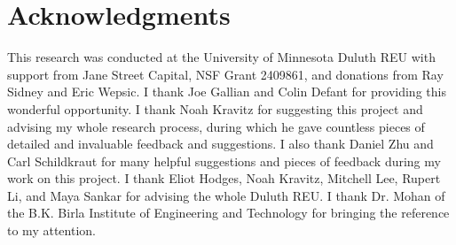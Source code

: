 \documentclass[10pt,a4paper]{article}
\theoremstyle{definition}
\theoremstyle{remark}
\numberwithin{equation}{section}
\numberwithin{theorem}{section}
\begin{document}
\section*{Acknowledgments}
This research was conducted at the University of Minnesota Duluth REU with support from Jane Street Capital, NSF Grant 2409861, and donations from Ray Sidney and Eric Wepsic. I thank Joe Gallian and Colin Defant for providing this wonderful opportunity. I thank Noah Kravitz for suggesting this project and advising my whole research process, during which he gave countless pieces of detailed and invaluable feedback and suggestions. I also thank Daniel Zhu and Carl Schildkraut for many helpful suggestions and pieces of feedback during my work on this project. I thank Eliot Hodges, Noah Kravitz, Mitchell Lee, Rupert Li, and Maya Sankar for advising the whole Duluth REU. I thank Dr. Mohan of the B.K. Birla Institute of Engineering and Technology for bringing the reference \cite{TX19} to my attention.
\end{document}
